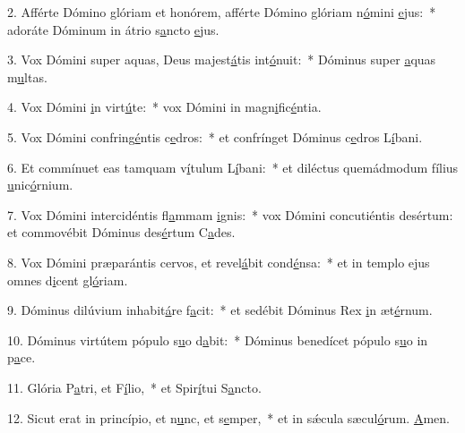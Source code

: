 2. Afférte Dómino glóriam et honórem, afférte Dómino glóriam n\uline{ó}mini \uline{e}jus:~* adoráte Dóminum in átrio s\uline{a}ncto \uline{e}jus.\par 
3. Vox Dómini super aquas, Deus majest\uline{á}tis int\uline{ó}nuit:~* Dóminus super \uline{a}quas m\uline{u}ltas.\par 
4. Vox Dómini \uline{i}n virt\uline{ú}te:~* vox Dómini in magn\uline{i}fic\uline{é}ntia.\par 
5. Vox Dómini confring\uline{é}ntis c\uline{e}dros:~* et confrínget Dóminus c\uline{e}dros L\uline{í}bani.\par 
6. Et commínuet eas tamquam v\uline{í}tulum L\uline{í}bani:~* et diléctus quemádmodum fílius \uline{u}nic\uline{ó}rnium.\par 
7. Vox Dómini intercidéntis fl\uline{a}mmam \uline{i}gnis:~* vox Dómini concutiéntis desértum: et commovébit Dóminus des\uline{é}rtum C\uline{a}des.\par 
8. Vox Dómini præparántis cervos, et revel\uline{á}bit cond\uline{é}nsa:~* et in templo ejus omnes d\uline{i}cent gl\uline{ó}riam.\par 
9. Dóminus dilúvium inhabit\uline{á}re f\uline{a}cit:~* et sedébit Dóminus Rex \uline{i}n æt\uline{é}rnum.\par 
10. Dóminus virtútem pópulo s\uline{u}o d\uline{a}bit:~* Dóminus benedícet pópulo s\uline{u}o in p\uline{a}ce.\par 
11. Glória P\uline{a}tri, et F\uline{í}lio,~* et Spir\uline{í}tui S\uline{a}ncto.\par 
12. Sicut erat in princípio, et n\uline{u}nc, et s\uline{e}mper,~* et in sǽcula sæcul\uline{ó}rum. \uline{A}men.\par 
